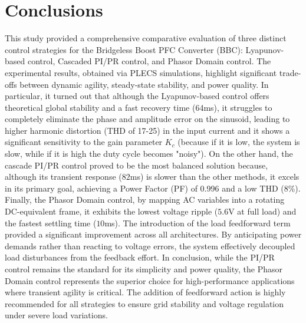 \documentclass[DIV=calc, paper=a4, fontsize=11pt, twocolumn]{scrartcl}	 %
\begin{document}
\section{Conclusions}

This study provided a comprehensive comparative evaluation of three distinct control strategies for the Bridgeless Boost PFC Converter (BBC): Lyapunov-based control, Cascaded PI/PR control, and Phasor Domain control. The experimental results, obtained via PLECS simulations, highlight significant trade-offs between dynamic agility, steady-state stability, and power quality. In particular, it turned out that although the Lyapunov-based control offers theoretical global stability and a fast recovery time (64ms), it  struggles to completely eliminate the phase and amplitude error on the sinusoid, leading to higher harmonic distortion (THD of 17-25) in the input current and it shows a significant sensitivity to the gain parameter $K_c$ (because if it is low, the system is slow, while if it is high the duty cycle becomes "noisy"). On the other hand, the cascade PI/PR control proved to be the most balanced solution because, although its transient response ($82$ms) is slower than the other methods, it excels in its primary goal, achieving a Power Factor (PF) of 0.996 and a low THD (8\%). Finally, the Phasor Domain control, by mapping AC variables into a rotating DC-equivalent frame, it exhibits the lowest voltage ripple ($5.6$V at full load) and the fastest settling time ($10$ms).  
The introduction of the load feedforward term provided a significant improvement across all architectures. By anticipating power demands rather than reacting to voltage errors, the system effectively decoupled load disturbances from the feedback effort.
In conclusion, while the PI/PR control remains the standard for its simplicity and power quality, the Phasor Domain control represents the superior choice for high-performance applications where transient agility is critical. The addition of feedforward action is highly recommended for all strategies to ensure grid stability and voltage regulation under severe load variations.
\end{document}
